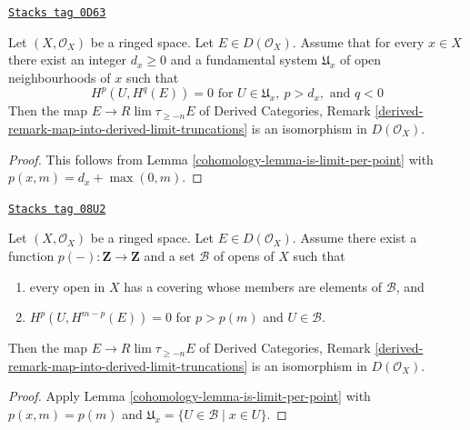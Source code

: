 \begin{lemma}
\label{cohomology-lemma-is-limit-spaltenstein}
\href{https://stacks.math.columbia.edu/tag/0D63}{\texttt{Stacks tag 0D63}}

\begin{reference}
\cite[Proposition 3.13]{Spaltenstein}
\end{reference}
Let $(X, \mathcal{O}_X)$ be a ringed space. Let $E \in D(\mathcal{O}_X)$.
Assume that for every $x \in X$ there exist an integer $d_x \geq 0$ and
a fundamental system $\mathfrak{U}_x$ of open neighbourhoods of $x$
such that
$$
H^p(U, H^q(E)) = 0 \text{ for }
U \in \mathfrak{U}_x,\ p > d_x, \text{ and }q < 0
$$
Then the map $E \to R\lim \tau_{\geq -n} E$ of
Derived Categories, Remark
\ref{derived-remark-map-into-derived-limit-truncations}
is an isomorphism in $D(\mathcal{O}_X)$.
\end{lemma}

\begin{proof}

This follows from Lemma \ref{cohomology-lemma-is-limit-per-point}
with $p(x, m) = d_x + \max(0, m)$.
\end{proof}

\begin{lemma}[Is limit]
\label{cohomology-lemma-is-limit}
\href{https://stacks.math.columbia.edu/tag/08U2}{\texttt{Stacks tag 08U2}}

Let $(X, \mathcal{O}_X)$ be a ringed space. Let $E \in D(\mathcal{O}_X)$.
Assume there exist a function $p(-) : \mathbf{Z} \to \mathbf{Z}$
and a set $\mathcal{B}$ of opens of $X$ such that
\begin{enumerate}
\item every open in $X$ has a covering whose members are
elements of $\mathcal{B}$, and
\item $H^p(U, H^{m - p}(E)) = 0$ for $p > p(m)$ and $U \in \mathcal{B}$.
\end{enumerate}
Then the map $E \to R\lim \tau_{\geq -n} E$ of
Derived Categories, Remark
\ref{derived-remark-map-into-derived-limit-truncations}
is an isomorphism in $D(\mathcal{O}_X)$.
\end{lemma}

\begin{proof}

Apply Lemma \ref{cohomology-lemma-is-limit-per-point}
with $p(x, m) = p(m)$ and
$\mathfrak{U}_x = \{U \in \mathcal{B} \mid x \in U\}$.
\end{proof}

